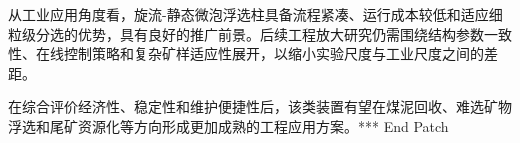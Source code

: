\label{chap:engineering}


从工业应用角度看，旋流-静态微泡浮选柱具备流程紧凑、运行成本较低和适应细粒级分选的优势，具有良好的推广前景。后续工程放大研究仍需围绕结构参数一致性、在线控制策略和复杂矿样适应性展开，以缩小实验尺度与工业尺度之间的差距。

\vspace{0.4\baselineskip}

在综合评价经济性、稳定性和维护便捷性后，该类装置有望在煤泥回收、难选矿物浮选和尾矿资源化等方向形成更加成熟的工程应用方案。*** End Patch
